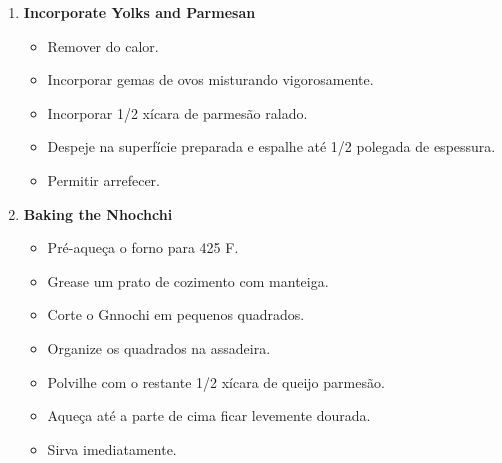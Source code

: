 \documentclass [11pt, letterpaper] {article}
\begin{document}
\begin {description}
\begin {enumerate}
\item {\bf Incorporate Yolks and Parmesan}
\begin {itemize}
\item Remover do calor.
\item Incorporar gemas de ovos misturando vigorosamente.
\item Incorporar 1/2 xícara de parmesão ralado.
\item Despeje na superfície preparada e espalhe até 1/2 polegada de espessura.
\item Permitir arrefecer.
\end {itemize}

\item {\bf Baking the Nhochchi}
\begin {itemize}
\item Pré-aqueça o forno para 425 F.
\item Grease um prato de cozimento com manteiga.
\item Corte o Gnnochi em pequenos quadrados.
\item Organize os quadrados na assadeira.
\item Polvilhe com o restante 1/2 xícara de queijo parmesão.
\item Aque\c{c}a até a parte de cima ficar levemente dourada.
\item Sirva imediatamente.
\end {itemize}

\end {enumerate}
\end {description}
\end{document}
